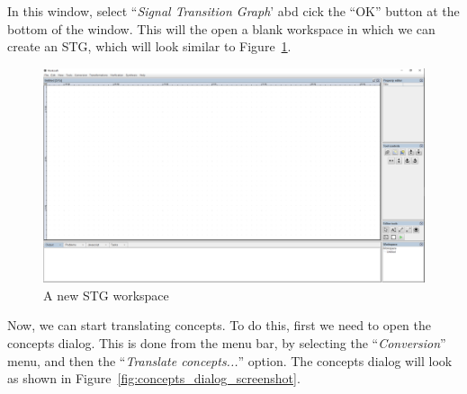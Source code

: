 \documentclass{proc}
\begin{document}
In this window, select ``\emph{Signal Transition Graph}' abd cick the ``OK'' button at the bottom of the window. This will the open a blank workspace in which we can create an STG, which 
will look similar to Figure~\ref{fig:blank_stg_work}.

\begin{figure}[H]
\begin{centering}
\includegraphics[scale=0.2]{images/new_stg_screenshot}
\par\end{centering}

\begin{centering}
\protect\caption{\label{fig:blank_stg_work}A new STG workspace}

\par\end{centering}

\end{figure}

Now, we can start translating concepts. To do this, first we need to open the concepts dialog.  This is done from the menu bar, by selecting the ``\emph{Conversion}'' menu, and then the 
``\emph{Translate concepts...}'' option. The concepts dialog will look as shown in Figure~\ref{fig:concepts_dialog_screenshot}.
\end{document}
